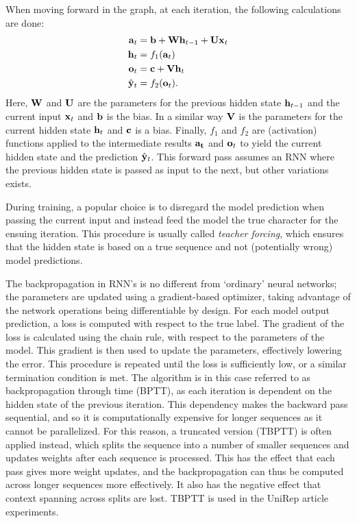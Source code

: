 \documentclass[a4paper,12pt]{article}
\begin{document}
When moving forward in the graph, at each iteration, the following calculations are done:
\begin{align*}
    \mathbf{ a }_t &= \mathbf{ b } + \mathbf{ Wh }_{t - 1} + \mathbf{ Ux }_t\\
    \mathbf{ h }_t &= f_1 {\mathopen{} \left( \mathbf{ a }_t \right) \mathclose{}}\\
    \mathbf{ o }_t &= \mathbf{ c } + \mathbf{ Vh }_t\\
    \hat{\mathbf{ y }}_t &= f_2 {\mathopen{} \left( \mathbf{ o }_t \right) \mathclose{}}.
\end{align*}
Here, $\mathbf{ W }$ and $\mathbf{ U }$ are the parameters for the previous hidden state $\mathbf{ h }_{t-1}$ and the current input $\mathbf{ x }_t$ and $\mathbf{ b }$ is the bias. In a similar way $\mathbf{ V }$ is the parameters for the current hidden state $\mathbf{ h }_t$ and $\mathbf{ c }$ is a bias. Finally, $f_1$ and $f_2$ are (activation) functions applied to the intermediate results $\mathbf{ a_t }$ and $\mathbf{ o }_t$ to yield the current hidden state and the prediction $\hat{\mathbf{ y }}_t$. This forward pass assumes an RNN where the previous hidden state is passed as input to the next, but other variations exists.

During training, a popular choice is to disregard the model prediction when passing the current input and instead feed the model the true character for the ensuing iteration. This procedure is usually called \textit{teacher forcing}, which ensures that the hidden state is based on a true sequence and not (potentially wrong) model predictions.

The backpropagation in RNN's is no different from `ordinary' neural networks; the parameters are updated using a gradient-based optimizer, taking advantage of the network operations being differentiable by design. For each model output prediction, a loss is computed with respect to the true label. The gradient of the loss is calculated using the chain rule, with respect to the parameters of the model. This gradient is then used to update the parameters, effectively lowering the error. This procedure is repeated until the loss is sufficiently low, or a similar termination condition is met. The algorithm is in this case referred to as backpropagation through time (BPTT), as each iteration is dependent on the hidden state of the previous iteration. This dependency makes the backward pass sequential, and so it is computationally expensive for longer sequences as it cannot be parallelized. For this reason, a truncated version (TBPTT) is often applied instead, which splits the sequence into a number of smaller sequences and updates weights after each sequence is processed. This has the effect that each pass gives more weight updates, and the backpropagation can thus be computed across longer sequences more effectively. It also has the negative effect that context spanning across splits are lost. TBPTT is used in the UniRep article experiments.
\end{document}
